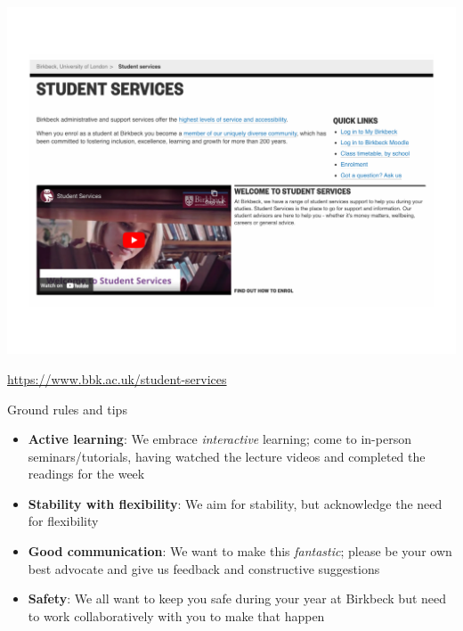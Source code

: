 \documentclass[
  10pt,
  ignorenonframetext,
]{beamer}
\begin{document}
\begin{frame}
\begin{center}\includegraphics[width=1\linewidth]{Figs/student} \end{center}
\vspace{0.1cm}
\begin{center}
\url{https://www.bbk.ac.uk/student-services}
\end{center}
\end{frame}

\begin{frame}{Ground rules and tips}
\protect\hypertarget{ground-rules-and-tips}{}
\begin{itemize}
  \item \textbf{Active learning}: We embrace \textit{interactive} learning; come to in-person seminars/tutorials, having watched the lecture videos and completed the readings for the week
  \vspace{0.3cm}
  \item \textbf{Stability with flexibility}: We aim for stability, but acknowledge the need for flexibility
  \vspace{0.3cm}
  \item \textbf{Good communication}: We want to make this \textit{fantastic}; please be your own best advocate and give us feedback and constructive suggestions
  \vspace{0.3cm}
  \item \textbf{Safety}: We all want to keep you safe during your year at Birkbeck but need to work collaboratively with you to make that happen
\end{itemize}
\end{frame}
\end{document}
